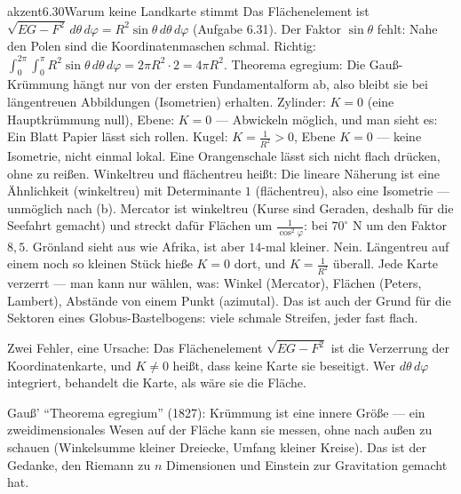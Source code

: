 \begin{loesungkarte}{akzent}{6.30}{Warum keine Landkarte stimmt}
Das Flächenelement ist $\sqrt{EG - F^{2}}\,d\theta\,d\varphi = R^{2}\sin\theta\,d\theta\,d\varphi$ (Aufgabe 6.31). Der Faktor $\sin\theta$ fehlt: Nahe den Polen sind die Koordinatenmaschen schmal. Richtig: $\int_0^{2\pi}\int_0^{\pi}R^{2}\sin\theta\,d\theta\,d\varphi = 2\pi R^{2}\cdot2 = 4\pi R^{2}$.
Theorema egregium: Die Gauß-Krümmung hängt nur von der ersten Fundamentalform ab, also bleibt sie bei längentreuen Abbildungen (Isometrien) erhalten. Zylinder: $K = 0$ (eine Hauptkrümmung null), Ebene: $K = 0$ --- Abwickeln möglich, und man sieht es: Ein Blatt Papier lässt sich rollen. Kugel: $K = \frac1{R^{2}} > 0$, Ebene $K = 0$ --- keine Isometrie, nicht einmal lokal. Eine Orangenschale lässt sich nicht flach drücken, ohne zu reißen.
Winkeltreu und flächentreu heißt: Die lineare Näherung ist eine Ähnlichkeit (winkeltreu) mit Determinante $1$ (flächentreu), also eine Isometrie --- unmöglich nach (b). Mercator ist winkeltreu (Kurse sind Geraden, deshalb für die Seefahrt gemacht) und streckt dafür Flächen um $\frac1{\cos^{2}\varphi}$: bei $70^{\circ}$ N um den Faktor $8{,}5$. Grönland sieht aus wie Afrika, ist aber $14$-mal kleiner.
Nein. Längentreu auf einem noch so kleinen Stück hieße $K = 0$ dort, und $K = \frac1{R^{2}}$ überall. Jede Karte verzerrt --- man kann nur wählen, was: Winkel (Mercator), Flächen (Peters, Lambert), Abstände von einem Punkt (azimutal). Das ist auch der Grund für die Sektoren eines Globus-Bastelbogens: viele schmale Streifen, jeder fast flach.
\begin{fehler}\kastentext
Zwei Fehler, eine Ursache: Das Flächenelement $\sqrt{EG - F^{2}}$ ist die Verzerrung der Koordinatenkarte, und $K\neq0$ heißt, dass keine Karte sie beseitigt. Wer $d\theta\,d\varphi$ integriert, behandelt die Karte, als wäre sie die Fläche.
\end{fehler}
\begin{mitnehmen}\kastentext
Gauß' \enquote{Theorema egregium} (1827): Krümmung ist eine innere Größe --- ein zweidimensionales Wesen auf der Fläche kann sie messen, ohne nach außen zu schauen (Winkelsumme kleiner Dreiecke, Umfang kleiner Kreise). Das ist der Gedanke, den Riemann zu $n$ Dimensionen und Einstein zur Gravitation gemacht hat.
\end{mitnehmen}
\end{loesungkarte}

